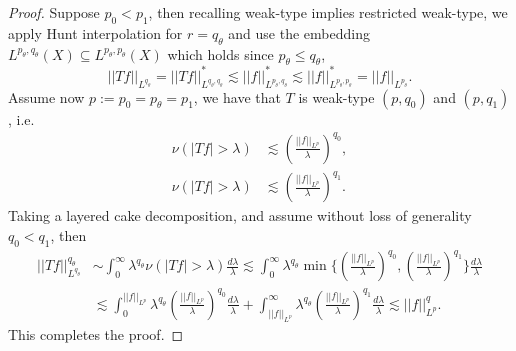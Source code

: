 \documentclass[reqno]{amsart}
\theoremstyle{definition}
\theoremstyle{remark}
\begin{document}
\begin{proof}
	Suppose $p_0 < p_1$, then recalling weak-type implies restricted weak-type, we apply Hunt interpolation for $r = q_\theta$ and use the embedding $L^{p_\theta, q_\theta} (X) \subseteq L^{p_\theta, p_\theta} (X)$ which holds since $p_\theta \leq q_\theta$, 
		\[ ||Tf||_{L^{q_\theta}} = ||Tf||_{L^{q_\theta, q_\theta}}^* \lesssim ||f||_{L^{p_\theta, q_\theta}}^* \lesssim ||f||_{L^{p_\theta, p_\theta}}^* = ||f||_{L^{p_\theta}}. \]
	Assume now $p:= p_0 = p_\theta = p_1$, we have that $T$ is weak-type $(p, q_0)$ and $(p, q_1)$, i.e.
	\begin{align*}
		\nu( |T f| > \lambda) 
			&\lesssim \left(\frac{||f||_{L^p}}{\lambda} \right)^{q_0}, \\
		\nu( |T f| > \lambda) 
			&\lesssim \left(\frac{||f||_{L^p}}{\lambda} \right)^{q_1}.
	\end{align*}
	Taking a layered cake decomposition, and assume without loss of generality $q_0 < q_1$, then 
		\begin{align*}
			||Tf||_{L^{q_\theta}}^{q_\theta}
				&\sim \int_0^\infty \lambda^{q_\theta} \nu (|Tf| > \lambda) \frac{d\lambda}{\lambda} \lesssim \int_0^\infty \lambda^{q_\theta} \min \Big\{ \left(\frac{||f||_{L^p}}{\lambda} \right)^{q_0}, \left(\frac{||f||_{L^p}}{\lambda} \right)^{q_1}  \Big\} \frac{d\lambda}{\lambda} \\
				&\lesssim \int_0^{||f||_{L^p}} \lambda^{q_\theta} \left( \frac{||f||_{L^p}}{\lambda} \right)^{q_0}  \frac{d\lambda}{\lambda} + \int_{||f||_{L^p}}^\infty \lambda^{q_\theta} \left( \frac{||f||_{L^p}}{\lambda} \right)^{q_1}  \frac{d\lambda}{\lambda}  \lesssim ||f||_{L^p}^q.
		\end{align*}
	This completes the proof. 	
\end{proof}

 
\end{document}
